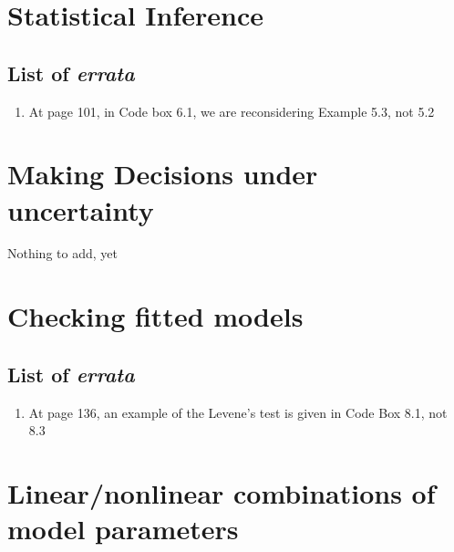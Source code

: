 \documentclass[
  letterpaper,
  DIV=11,
  numbers=noendperiod]{scrreprt}
\providecommand{\tightlist}{%
  \setlength{\itemsep}{0pt}\setlength{\parskip}{0pt}}
\begin{document}

\chapter{Statistical Inference}\label{statistical-inference}

\section{\texorpdfstring{List of
\emph{errata}}{List of errata}}\label{list-of-errata-1}

\begin{enumerate}
\def\labelenumi{\arabic{enumi}.}
\tightlist
\item
  At page 101, in Code box 6.1, we are reconsidering Example 5.3, not
  5.2
\end{enumerate}


\chapter{Making Decisions under
uncertainty}\label{making-decisions-under-uncertainty}

Nothing to add, yet


\chapter{Checking fitted models}\label{checking-fitted-models}

\section{\texorpdfstring{List of
\emph{errata}}{List of errata}}\label{list-of-errata-2}

\begin{enumerate}
\def\labelenumi{\arabic{enumi}.}
\tightlist
\item
  At page 136, an example of the Levene's test is given in Code Box 8.1,
  not 8.3
\end{enumerate}


\chapter{Linear/nonlinear combinations of model
parameters}\label{linearnonlinear-combinations-of-model-parameters}
\end{document}
